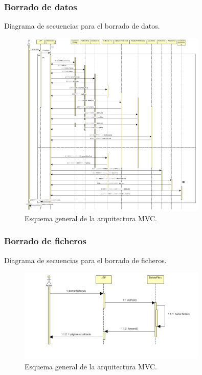 \subsubsection{Borrado de datos}
Diagrama de secuencias para el borrado de datos.
\begin{figure}[!htbp]
  \centering
    \includegraphics[width=0.8\textwidth]{../img/diagramas/secuencias/2.jpg}
  \caption{Esquema general de la arquitectura MVC.}
  \label{mvc}
\end{figure}

\subsubsection{Borrado de ficheros}
Diagrama de secuencias para el borrado de ficheros.
\begin{figure}[!htbp]
  \centering
    \includegraphics[width=0.8\textwidth]{../img/diagramas/secuencias/1.jpg}
  \caption{Esquema general de la arquitectura MVC.}
  \label{mvc}
\end{figure}

